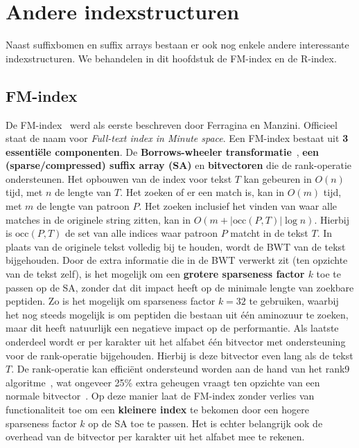 \chapter{Andere indexstructuren}\label{ch:andere-indices}
Naast suffixbomen en suffix arrays bestaan er ook nog enkele andere interessante indexstructuren.
We behandelen in dit hoofdstuk de FM-index en de R-index.


\section{FM-index}\label{sec:fm-index}
De FM-index~\cite{fm_index} werd als eerste beschreven door Ferragina en Manzini.
Officieel staat de naam voor \textit{Full-text index in Minute space}.
Een FM-index bestaat uit \textbf{3 essentiële componenten}.
De \textbf{Borrows-wheeler transformatie}~\cite{bwt}, \textbf{een (sparse/compressed) suffix array (SA)} en \textbf{bitvectoren} die de rank-operatie ondersteunen.
Het opbouwen van de index voor tekst $T$ kan gebeuren in $O(n)$ tijd, met $n$ de lengte van $T$.
Het zoeken of er een match is, kan in $O(m)$ tijd, met $m$ de lengte van patroon $P$.
Het zoeken inclusief het vinden van waar alle matches in de originele string zitten, kan in $O(m + \text{|occ}(P, T)\text{|} \log n)$.
Hierbij is $\text{occ}(P, T)$ de set van alle indices waar patroon $P$ matcht in de tekst $T$.
In plaats van de originele tekst volledig bij te houden, wordt de BWT van de tekst bijgehouden.
Door de extra informatie die in de BWT verwerkt zit (ten opzichte van de tekst zelf), is het mogelijk om een \textbf{grotere sparseness factor $k$} toe te passen op de SA, zonder dat dit impact heeft op de minimale lengte van zoekbare peptiden.
Zo is het mogelijk om sparseness factor $k = 32$ te gebruiken, waarbij het nog steeds mogelijk is om peptiden die bestaan uit één aminozuur te zoeken, maar dit heeft natuurlijk een negatieve impact op de performantie.
Als laatste onderdeel wordt er per karakter uit het alfabet één bitvector met ondersteuning voor de rank-operatie bijgehouden.
Hierbij is deze bitvector even lang als de tekst $T$.
De rank-operatie kan efficiënt ondersteund worden aan de hand van het rank9 algoritme~\cite{rank9}, wat ongeveer 25\% extra geheugen vraagt ten opzichte van een normale bitvector~\cite{CCB_course}.
Op deze manier laat de FM-index zonder verlies van functionaliteit toe om een \textbf{kleinere index} te bekomen door een hogere sparseness factor $k$ op de SA toe te passen.
Het is echter belangrijk ook de overhead van de bitvector per karakter uit het alfabet mee te rekenen.
